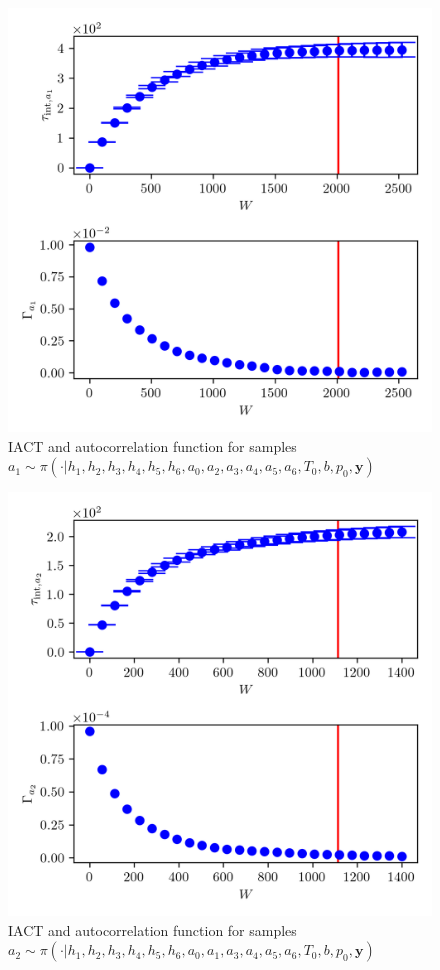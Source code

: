 \begin{figure}[ht!]
	\centering
	\includegraphics{UwerrTauIntTWalk7.png}
	\caption[IACT and autocorrelation function for $a_1$ samples.]{IACT and autocorrelation function for samples $a_1 \sim \pi( \cdot | h_1, h_2,h_3,h_4,h_5,h_6,a_0,a_2,a_3,a_4,a_5,a_6,T_0,b,p_0,  \bm{y})$}
	\label{fig:}
\end{figure}


\begin{figure}[ht!]
	\centering
	\includegraphics{UwerrTauIntTWalk8.png}
	\caption[IACT and autocorrelation function for $a_2$ samples.]{IACT and autocorrelation function for samples $a_2 \sim \pi( \cdot | h_1, h_2,h_3,h_4,h_5,h_6,a_0,a_1,a_3,a_4,a_5,a_6,T_0,b,p_0,  \bm{y})$}
	\label{fig:}
\end{figure}



